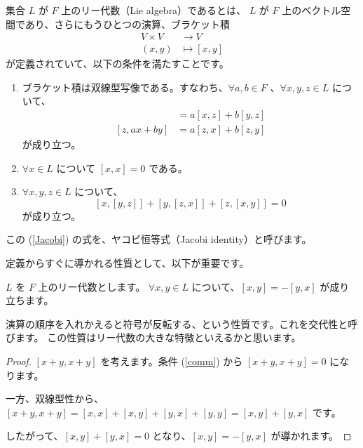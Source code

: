 \documentclass{ltjsarticle}
\begin{document}
\begin{definition}[リー代数]
    集合 $L$ が $F$ 上のリー代数（Lie algebra）であるとは、
    $L$ が $F$ 上のベクトル空間であり、さらにもうひとつの演算、ブラケット積
    \begin{align*}
        V \times V & \to V          \\
        (x, y)     & \mapsto [x, y]
    \end{align*}
    が定義されていて、以下の条件を満たすことです。
    \begin{enumerate}
        \item ブラケット積は双線型写像である。すなわち、$\forall a, b \in F$ 、$\forall x, y, z \in L$ について、
              \begin{align*}
                  [ax + by, z] & = a[x, z] + b[y, z] \\
                  [z, ax + by] & = a[z, x] + b[z, y]
              \end{align*}
              が成り立つ。
        \item \label{comm} $\forall x \in L$ について $[x, x] = 0$ である。
        \item \label{Jacobi} $\forall x, y, z \in L$ について、
              \[
                  [x, [y, z]] + [y, [z, x]] + [z, [x, y]] = 0
              \]
              が成り立つ。
    \end{enumerate}
\end{definition}

この (\ref{Jacobi}) の式を、ヤコビ恒等式（Jacobi identity）と呼びます。

定義からすぐに導かれる性質として、以下が重要です。

\begin{proposition}[交代性]
    $L$ を $F$ 上のリー代数とします。
    $\forall x, y\in L$ について、$[x, y] = -[y, x]$ が成り立ちます。
\end{proposition}

演算の順序を入れかえると符号が反転する、という性質です。これを交代性と呼びます。
この性質はリー代数の大きな特徴といえるかと思います。

\begin{proof}
    $[x + y, x + y]$ を考えます。条件 (\ref{comm}) から $[x + y, x + y] = 0$ になります。

    一方、双線型性から、$[x + y, x + y] = [x, x] + [x, y] + [y, x] + [y, y] = [x, y] + [y, x]$ です。

    したがって、$[x, y] + [y, x] = 0$ となり、$[x, y] = -[y, x]$ が導かれます。
\end{proof}
\end{document}
